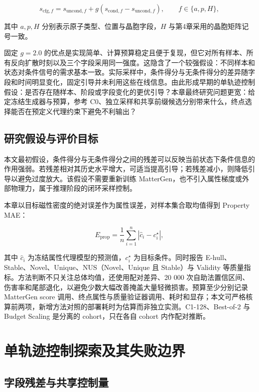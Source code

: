 \[
s_{\mathrm{cfg},f}
=s_{\mathrm{uncond},f}+g\left(s_{\mathrm{cond},f}-s_{\mathrm{uncond},f}\right),
\qquad
f\in\{a,p,H\},
\]

其中 \(a,p,H\) 分别表示原子类型、位置与晶胞字段，\(H\) 与第4章采用的晶胞矩阵记号一致。

固定 \(g=2.0\) 的优点是实现简单、计算预算稳定且便于复现，但它对所有样本、所有反向扩散时刻以及三个字段采用同一强度。这隐含了一个较强假设：不同样本和状态对条件信号的需求基本一致。实际采样中，条件得分与无条件得分的差异随字段和时间明显变化，固定引导并未利用这些在线信息。由此形成早期的单轨迹控制假设：是否存在随样本、阶段或字段变化的更优引导？本章最终研究问题更宽：给定冻结生成器与预算，参考 C0、独立采样和共享前缀候选分别带来什么，终点选择能否在预定义代理约束下避免不利输出？

\subsection{研究假设与评价目标}

本文最初假设，条件得分与无条件得分之间的残差可以反映当前状态下条件信息的作用强弱。若残差相对其历史水平增大，可适当提高引导；若残差减小，则降低引导以避免过度放大。该假设不需要重新训练 MatterGen，也不引入属性梯度或外部物理力，属于推理阶段的闭环采样控制。

本章以目标磁性密度的绝对误差作为属性误差，对样本集合取均值得到 Property MAE：

\[
E_{\mathrm{prop}}=\frac{1}{n}\sum_{i=1}^{n}
\left|\hat c_i-c_i^{\star}\right|,
\]

其中 \(\hat c_i\) 为冻结属性代理模型的预测值，\(c_i^{\star}\) 为目标条件。同时报告 E-hull、Stable、Novel、Unique、NUS（Novel、Unique 且 Stable）与 Validity 等质量指标。方法判断不只关注总体均值，还使用配对差异、20 000 次自助法置信区间、伤害率和尾部退化，以避免少数大幅改善掩盖大量轻微损害。预算至少分别记录 MatterGen score 调用、终点属性与质量验证器调用、耗时和显存；本文可严格核算前两项，新增方法对照的部署耗时为估算而非独立实测。C1-128、Best-of-2 与 Budget Scaling 是分离的 cohort，只在各自 cohort 内作配对推断。

\section{单轨迹控制探索及其失败边界}

\subsection{字段残差与共享控制量}

